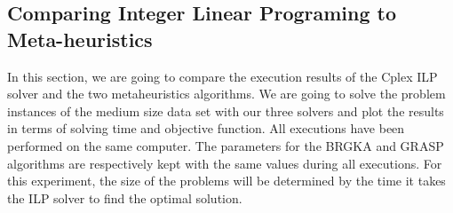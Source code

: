 \subsection{Comparing Integer Linear Programing to Meta-heuristics}

In this section, we are going to compare the execution results of the Cplex ILP solver and the two metaheuristics algorithms. We are going to solve the problem instances of the medium size data set with our three solvers and plot the results in terms of solving time and objective function. All executions have been performed on the same computer. The parameters for the BRGKA and GRASP algorithms are respectively kept with the same values during all executions. For this experiment, the size of the problems will be determined by the time it takes the ILP solver to find the optimal solution.\\


